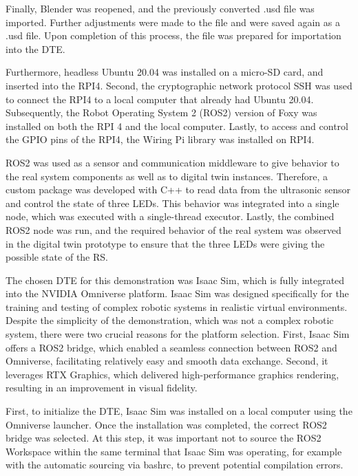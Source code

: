 \documentclass[conference]{IEEEtran}
\begin{document}
    Finally, Blender was reopened, and the previously converted .usd file was imported. Further adjustments were made to the file and were saved again as a .usd file. Upon completion of this process, 
    the file was prepared for importation into the DTE.

    Furthermore, headless Ubuntu 20.04 was installed on a micro-SD card, and inserted into the RPI4. Second, the cryptographic network protocol SSH was used to connect the RPI4 to a local computer that already had Ubuntu 20.04.
     Subsequently, the Robot Operating System 2 (ROS2) version of Foxy was installed on both the RPI 4 and the local computer. 
     Lastly, to access and control the GPIO pins of the RPI4, the Wiring Pi library was installed on RPI4.

    ROS2 was used as a sensor and communication middleware to give behavior to the real system components as well as to digital twin instances. 
    Therefore, a custom package was developed with C++  to read data from the ultrasonic sensor and control the state of three LEDs. This behavior was integrated into a single node, which was executed with a single-thread executor. Lastly, the combined ROS2 node was run, and the required behavior of the real system was observed in the digital twin prototype to ensure that the three LEDs were giving the possible state of the RS.

    The chosen DTE for this demonstration was Isaac Sim, which is fully integrated into the NVIDIA Omniverse platform. Isaac Sim was designed specifically for the training and testing of complex robotic 
    systems in realistic virtual environments. Despite the simplicity of the demonstration, which was not a complex robotic system, there were two crucial reasons for the platform selection. 
    First, Isaac Sim offers a ROS2 bridge, which enabled a seamless connection between ROS2 and Omniverse, facilitating relatively easy and smooth data exchange. Second, it leverages RTX Graphics, 
    which delivered high-performance graphics rendering, resulting in an improvement in visual fidelity. 

    First, to initialize the DTE, Isaac Sim was installed on a local computer using the Omniverse launcher. Once the installation was completed, the correct ROS2 bridge was selected. 
    At this step, it was important not to source the ROS2 Workspace within the same terminal that Isaac Sim was operating, for example with the automatic sourcing via bashrc, to prevent potential compilation errors. 
\end{document}
